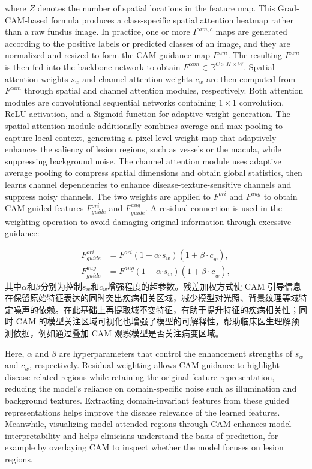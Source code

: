 where \(Z\) denotes the number of spatial locations in the feature map. This Grad-CAM-based formula produces a class-specific spatial attention heatmap rather than a raw fundus image. In practice, one or more \(I^{cam,c}\) maps are generated according to the positive labels or predicted classes of an image, and they are normalized and resized to form the CAM guidance map \(I^{cam}\). The resulting \(I^{cam}\) is then fed into the backbone network to obtain \(F^{cam} \in \mathbb{R}^{C \times H \times W}\). Spatial attention weights \(s_{w}\) and channel attention weights \(c_{w}\) are then computed from \(F^{cam}\) through spatial and channel attention modules, respectively. Both attention modules are convolutional sequential networks containing \(1 \times 1\) convolution, ReLU activation, and a Sigmoid function for adaptive weight generation. The spatial attention module additionally combines average and max pooling to capture local context, generating a pixel-level weight map that adaptively enhances the saliency of lesion regions, such as vessels or the macula, while suppressing background noise. The channel attention module uses adaptive average pooling to compress spatial dimensions and obtain global statistics, then learns channel dependencies to enhance disease-texture-sensitive channels and suppress noisy channels. The two weights are applied to \(F^{ori}\) and \(F^{aug}\) to obtain CAM-guided features \(F_{guide}^{ori}\) and \(F_{guide}^{aug}\). A residual connection is used in the weighting operation to avoid damaging original information through excessive guidance:

\begin{align}
F_{guide}^{ori} &= F^{ori}(1 + \alpha{\cdot s}_{w})(1 + {\beta \cdot c}_{w}), \label{eq:guide-feature-ori} \\
F_{guide}^{aug} &= F^{aug}(1 + \alpha{\cdot s}_{w})(1 + {\beta \cdot c}_{w}), \label{eq:guide-feature-aug}
\end{align}
其中\(\alpha\)和\(\beta\)分别为控制\(s_{w}\)和\(c_{w}\)增强程度的超参数。残差加权方式使 CAM 引导信息在保留原始特征表达的同时突出疾病相关区域，减少模型对光照、背景纹理等域特定噪声的依赖。在此基础上再提取域不变特征，有助于提升特征的疾病相关性；同时 CAM 的模型关注区域可视化也增强了模型的可解释性，帮助临床医生理解预测依据，例如通过叠加 CAM 观察模型是否关注病变区域。

Here, \(\alpha\) and \(\beta\) are hyperparameters that control the enhancement strengths of \(s_{w}\) and \(c_{w}\), respectively. Residual weighting allows CAM guidance to highlight disease-related regions while retaining the original feature representation, reducing the model's reliance on domain-specific noise such as illumination and background textures. Extracting domain-invariant features from these guided representations helps improve the disease relevance of the learned features. Meanwhile, visualizing model-attended regions through CAM enhances model interpretability and helps clinicians understand the basis of prediction, for example by overlaying CAM to inspect whether the model focuses on lesion regions.

